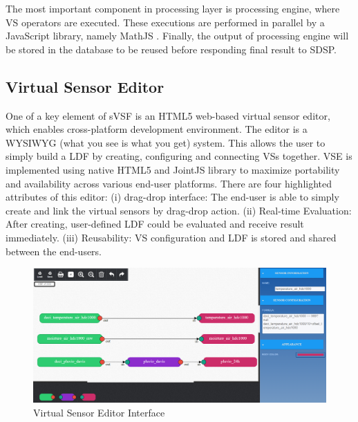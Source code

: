 The most important component in processing layer is processing engine, where VS operators are executed. These executions are performed in parallel by a JavaScript library, namely MathJS . Finally, the output of processing engine will be stored in the database to be reused before responding final result to SDSP.


\subsection{Virtual Sensor Editor}
One of a key element of sVSF is an HTML5 web-based virtual sensor editor, which enables cross-platform development environment. The editor is a WYSIWYG (what you see is what you get) system. This allows the user to simply build a LDF by creating, configuring and connecting VSs together. VSE is implemented using native HTML5 and JointJS  library to maximize portability and availability across various end-user platforms. There are four highlighted attributes of this editor: (i) drag-drop interface: The end-user is able to simply create and link the virtual sensors by drag-drop action. (ii) Real-time Evaluation: After creating, user-defined LDF could be evaluated and receive result immediately. (iii) Reusability: VS configuration and LDF is stored and shared between the end-users. \\

\begin{figure}[h!] 
 \begin{center} 
 \includegraphics[width=\textwidth]{./Part2/Chapter5/figures/vsf_editor_interface.png} 
    \caption{Virtual Sensor Editor Interface}
     \label{fig:c5_vsf_editor_interface}
  \end{center} 
\end{figure}

